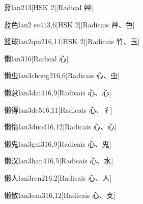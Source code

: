\begin{entry}{蓝}{lan2}{13}[HSK 2][Radical ⾋]
\end{entry}

\begin{entry}{蓝色}{lan2 se4}{13,6}[HSK 2][Radicais ⾋、⾊]
\end{entry}

\begin{entry}{篮球}{lan2qiu2}{16,11}[HSK 2][Radicais ⽵、⽟]
\end{entry}

\begin{entry}{懒}{lan3}{16}[Radical ⼼]
\end{entry}

\begin{entry}{懒虫}{lan3chong2}{16,6}[Radicais ⼼、⾍]
\end{entry}

\begin{entry}{懒怠}{lan3dai4}{16,9}[Radicais ⼼、⼼]
\end{entry}

\begin{entry}{懒得}{lan3de5}{16,11}[Radicais ⼼、⼻]
\end{entry}

\begin{entry}{懒惰}{lan3duo4}{16,12}[Radicais ⼼、⼼]
\end{entry}

\begin{entry}{懒鬼}{lan3gui3}{16,9}[Radicais ⼼、⿁]
\end{entry}

\begin{entry}{懒汉}{lan3han4}{16,5}[Radicais ⼼、⽔]
\end{entry}

\begin{entry}{懒人}{lan3ren2}{16,2}[Radicais ⼼、⼈]
\end{entry}

\begin{entry}{懒散}{lan3san3}{16,12}[Radicais ⼼、⽁]
\end{entry}

